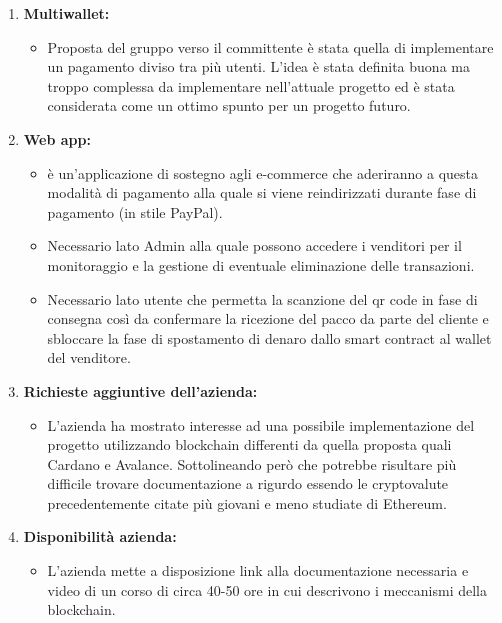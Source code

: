 \begin{enumerate}
	\item \textbf{Multiwallet:}
	\begin{itemize}
		\item Proposta del gruppo verso il committente è stata quella di implementare un pagamento diviso tra più utenti.
		 L'idea è stata definita buona ma troppo complessa da implementare nell'attuale progetto ed è stata considerata come un ottimo spunto per un progetto futuro.
	\end{itemize}

	\item \textbf{Web app:}
	\begin{itemize}
		\item è un'applicazione di sostegno agli e-commerce\glo{} che aderiranno a questa modalità di pagamento alla quale si viene reindirizzati durante fase di pagamento (in stile PayPal).
		\item Necessario lato Admin alla quale possono accedere i venditori per il monitoraggio e la gestione di eventuale eliminazione delle transazioni. 
		\item Necessario lato utente che permetta la scanzione del qr code\glo{} in fase di consegna così da confermare la ricezione del pacco da parte del cliente e sbloccare la fase di spostamento di denaro dallo smart contract\glo{} al wallet del venditore.
	\end{itemize}

	\item \textbf{Richieste aggiuntive dell'azienda:}
	\begin{itemize}
		\item L'azienda ha mostrato interesse ad una possibile implementazione del progetto utilizzando blockchain\glo{} differenti da quella proposta quali Cardano\glo{} e Avalance\glo{}.
		 Sottolineando però che potrebbe risultare più difficile trovare documentazione a rigurdo essendo le cryptovalute precedentemente citate più giovani e meno studiate di Ethereum\glo{}.
	\end{itemize}

	\item \textbf{Disponibilità azienda:}
	\begin{itemize}
		\item L'azienda mette a disposizione link alla documentazione necessaria e video di un corso di circa 40-50 ore in cui descrivono i meccanismi della blockchain\glo{}.
		
	\end{itemize}


\end{enumerate}
